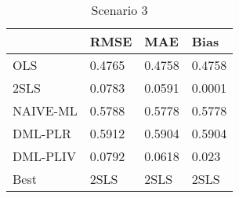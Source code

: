 \begin{table}[H]
\centering
\caption{Scenario 3}
\label{Scenario3}
\begin{tabular}{L{3.3333333333333335cm}L{2.6666666666666665cm}R{2.0cm}R{2.6666666666666665cm}}
\toprule
{} &    RMSE &     MAE &    Bias \\
\midrule
OLS      &  0.4765 &  0.4758 &  0.4758 \\
2SLS     &  0.0783 &  0.0591 &  0.0001 \\
NAIVE-ML &  0.5788 &  0.5778 &  0.5778 \\
DML-PLR  &  0.5912 &  0.5904 &  0.5904 \\
DML-PLIV &  0.0792 &  0.0618 &   0.023 \\
Best     &    2SLS &    2SLS &    2SLS \\
\bottomrule
\end{tabular}
\end{table}
